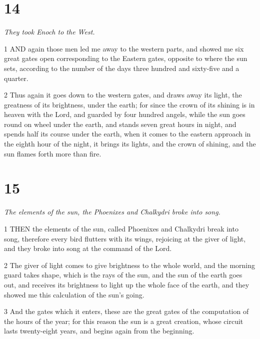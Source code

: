\chapter{14}

\par \textit{They took Enoch to the West.}

\par 1 AND again those men led me away to the western parts, and showed me six great gates open corresponding to the Eastern gates, opposite to where the sun sets, according to the number of the days three hundred and sixty-five and a quarter.

\par 2 Thus again it goes down to the western gates, and draws away its light, the greatness of its brightness, under the earth; for since the crown of its shining is in heaven with the Lord, and guarded by four hundred angels, while the sun goes round on wheel under the earth, and stands seven great hours in night, and spends half its course under the earth, when it comes to the eastern approach in the eighth hour of the night, it brings its lights, and the crown of shining, and the sun flames forth more than fire.

\chapter{15}

\par \textit{The elements of the sun, the Phoenixes and Chalkydri broke into song.}

\par 1 THEN the elements of the sun, called Phoenixes and Chalkydri break into song, therefore every bird flutters with its wings, rejoicing at the giver of light, and they broke into song at the command of the Lord.

\par 2 The giver of light comes to give brightness to the whole world, and the morning guard takes shape, which is the rays of the sun, and the sun of the earth goes out, and receives its brightness to light up the whole face of the earth, and they showed me this calculation of the sun's going.

\par 3 And the gates which it enters, these are the great gates of the computation of the hours of the year; for this reason the sun is a great creation, whose circuit lasts twenty-eight years, and begins again from the beginning.

